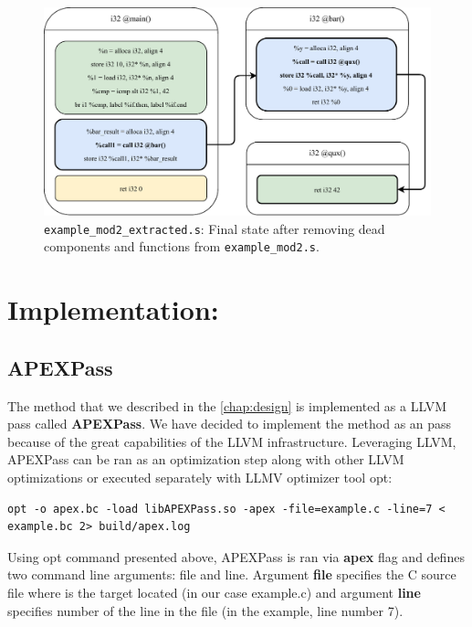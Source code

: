 \documentclass[12pt, twoside]{fithesis2}
\renewcommand{\_}{\leavevmode \kern0.07em\vbox{\hrule width0.4em}}
\begin{document}

\begin{figure}[ht]
    \centering
    \includegraphics[]{images/example_mod2/example_mod2_removing_done.pdf}
    \caption{
    \texttt{example_mod2_extracted.s}:
    Final state after removing dead components and functions from
    \texttt{example_mod2.s}.
    }
    \label{fig:mod2_done}
\end{figure}

\chapter{Implementation:}
\label{chap:implementation}

\section{APEXPass}
\label{sec:impl_apexpass}

The method that we described in the \autoref{chap:design} is implemented as a
LLVM pass called \textbf{APEXPass}.
We have decided to implement the method as an pass because of the great
capabilities of the LLVM infrastructure. Leveraging LLVM, APEXPass can be ran
as an optimization step along with other LLVM optimizations or executed
separately with LLMV optimizer tool opt:

\begin{verbatim}
opt -o apex.bc -load libAPEXPass.so -apex -file=example.c -line=7 < example.bc 2> build/apex.log
\end{verbatim}

Using opt command presented above, APEXPass is ran via \textbf{apex} flag and defines
two command line arguments: file and line.
Argument \textbf{file} specifies the C source file where is the target located
(in our case example.c) and argument \textbf{line} specifies number of the line
in the file (in the example, line number 7).
\end{document}
